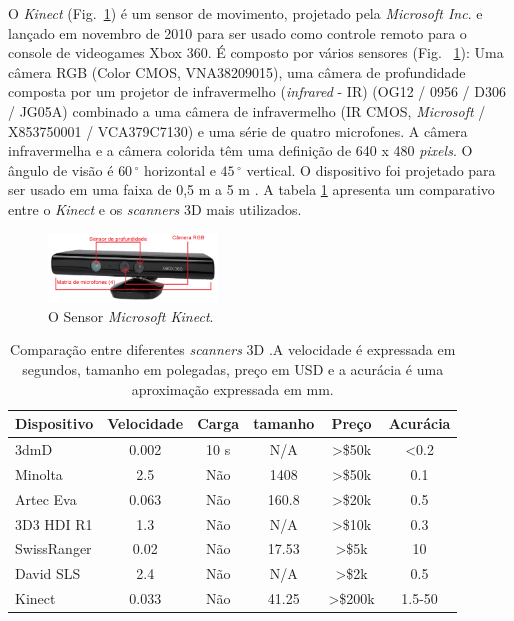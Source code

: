 O \textit{Kinect} (Fig.~\ref{fig:kinect}) é um sensor de movimento, projetado pela \textit{Microsoft Inc}. e lançado em novembro de 2010 para ser usado como controle remoto para o console de videogames Xbox 360. É composto por vários sensores (Fig. ~\ref{fig:kinect}): Uma câmera RGB (Color CMOS, VNA38209015), uma câmera de profundidade composta por um projetor de infravermelho (\textit{infrared} - IR) (OG12 / 0956 / D306 / JG05A) combinado a uma câmera de infravermelho (IR CMOS, \textit{Microsoft} / X853750001 / VCA379C7130) e uma série de quatro microfones. A câmera infravermelha e a câmera colorida têm uma definição de 640 x 480 \textit{pixels}. O ângulo de visão é $60\,^{\circ}$ horizontal e $45\,^{\circ}$ vertical. O dispositivo foi projetado para ser usado em uma faixa de 0,5 m a 5 m \cite{sevrin2015characterization}. A tabela \ref{table:comparativoScanners} apresenta um comparativo entre o \textit{Kinect} e os \textit{scanners} 3D mais utilizados.

 \begin{figure}[ht]
\centering
    \includegraphics[resolution=300,width=0.4\textwidth,natwidth=610,natheight=642]{images/kinect.png}
    \caption{O Sensor \textit{Microsoft Kinect}.}
    \label{fig:kinect}
\end{figure}


 \begin{table}[ht]
 \caption{Comparação entre diferentes \textit{scanners} 3D \cite{li2013using}.\newline A velocidade é expressada em segundos, tamanho em polegadas, preço em USD e a acurácia é uma aproximação expressada em mm.}
 \label{table:comparativoScanners}
 \begin{tabular}{|l|c|c|c|c|c|}
\hline  
 Dispositivo & Velocidade & Carga & tamanho & Preço & Acurácia \\ \hline  
 3dmD & 0.002 & 10 s & N/A & >\$50k & <0.2 \\ \hline  
 Minolta & 2.5 & Não & 1408 & >\$50k & 0.1 \\ \hline  
 Artec Eva & 0.063 & Não & 160.8 & >\$20k & 0.5 \\ \hline  
 3D3 HDI R1 & 1.3 & Não & N/A & >\$10k & 0.3 \\ \hline  
 SwissRanger & 0.02 & Não & 17.53 & >\$5k & 10 \\ \hline  
 David SLS & 2.4 & Não & N/A & >\$2k & 0.5 \\ \hline  
 Kinect & 0.033 & Não & 41.25 & >\$200k & 1.5-50 \\ \hline
\end{tabular}
\end{table}


